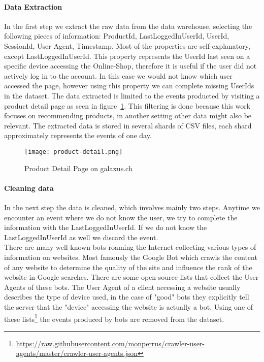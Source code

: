 \paragraph{Data Extraction}
In the first step we extract the raw data from the data warehouse, selecting the following pieces of information: ProductId, LastLoggedInUserId, UserId, SessionId, User Agent, Timestamp.
Most of the properties are self-explanatory, except LastLoggedInUserId.
This property represents the UserId last seen on a specific device accessing the Online-Shop, therefore it is useful if the user did not actively log in to the account.
In this case we would not know which user accessed the page, however using this property we can complete missing UserIds in the dataset.
The data extracted is limited to the events producted by visiting a product detail page as seen in figure~\ref{fig:product_detail}.
This filtering is done because this work focuses on recommending products, in another setting other data might also be relevant.
The extracted data is stored in several shards of CSV files, each shard approximately represents the events of one day.

\begin{figure}[ht]
	\centering
	\captionsetup{width=0.8\textwidth}
    \texttt{[image: product-detail.png]}
    \caption{Product Detail Page on galaxus.ch}
    \label{fig:product_detail}
\end{figure}

\paragraph{Cleaning data}
In the next step the data is cleaned, which involves mainly two steps.
Anytime we encounter an event where we do not know the user, we try to complete the information with the LastLoggedInUserId. 
If we do not know the LastLoggedInUserId as well we discard the event. \\
There are many well-known bots roaming the Internet collecting various types of information on websites.
Most famously the Google Bot which crawls the content of any website to determine the quality of the site and influence the rank of the website in Google searches.
There are some open-source lists that collect the User Agents of these bots.
The User Agent of a client accessing a website usually describes the type of device used, in the case of "good" bots they explicitly tell the server that the "device" accessing the website is actually a bot.
Using one of these lists\footnote{\url{https://raw.githubusercontent.com/monperrus/crawler-user-agents/master/crawler-user-agents.json}} the events produced by bots are removed from the dataset.

